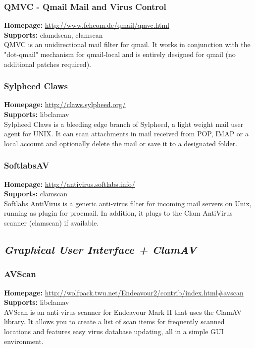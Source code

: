 \documentclass[a4paper,titlepage,12pt]{article}
\begin{document}
    \subsubsection{QMVC - Qmail Mail and Virus Control}
    \textbf{Homepage:} \url{http://www.fehcom.de/qmail/qmvc.html}\\
    \textbf{Supports:} clamdscan, clamscan\\[4pt]
    QMVC is an unidirectional mail filter for qmail. It works in conjunction
    with the "dot-qmail" mechanism for qmail-local and is entirely designed
    for qmail (no additional patches required).

    \subsubsection{Sylpheed Claws}
    \textbf{Homepage:} \url{http://claws.sylpheed.org/}\\
    \textbf{Supports:} libclamav\\[4pt]
    Sylpheed Claws is a bleeding edge branch of Sylpheed, a light weight mail
    user agent for UNIX. It can scan attachments in mail received from POP,
    IMAP or a local account and optionally delete the mail or save it to a
    designated folder.
 
    \subsubsection{SoftlabsAV}
    \textbf{Homepage:} \url{http://antivirus.softlabs.info/}\\
    \textbf{Supports:} clamscan\\[4pt]
    Softlabs AntiVirus is a generic anti-virus filter for incoming mail
    servers on Unix, running as plugin for procmail. In addition, it plugs
    to the Clam AntiVirus scanner (clamscan) if available.

    \subsection{\emph{Graphical User Interface + ClamAV}}

    \subsubsection{AVScan}
    \textbf{Homepage:} \url{http://wolfpack.twu.net/Endeavour2/contrib/index.html#avscan}\\
    \textbf{Supports:} libclamav\\[4pt]
    AVScan is an anti-virus scanner for Endeavour Mark II that uses the ClamAV
    library. It allows you to create a list of scan items for frequently
    scanned locations and features easy virus database updating, all in
    a simple GUI environment.
\end{document}
